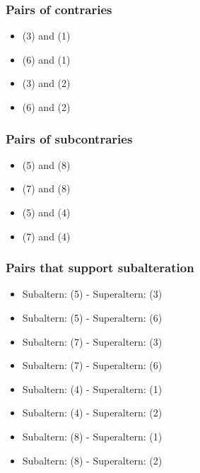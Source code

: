 \subsubsection{Pairs of contraries}
\begin{itemize}
    \item (3) and (1)
    \item (6) and (1)
    \item (3) and (2)
    \item (6) and (2)
\end{itemize}

\subsubsection{Pairs of subcontraries}
\begin{itemize}
    \item (5) and (8)
    \item (7) and (8)
    \item (5) and (4)
    \item (7) and (4)
\end{itemize}

\subsubsection{Pairs that support subalteration}
\begin{itemize}
    \item Subaltern: (5) - Superaltern: (3)
    \item Subaltern: (5) - Superaltern: (6)
    \item Subaltern: (7) - Superaltern: (3)
    \item Subaltern: (7) - Superaltern: (6)
    \item Subaltern: (4) - Superaltern: (1)
    \item Subaltern: (4) - Superaltern: (2)
    \item Subaltern: (8) - Superaltern: (1)
    \item Subaltern: (8) - Superaltern: (2)
\end{itemize}

